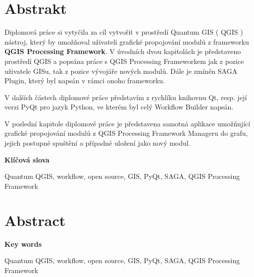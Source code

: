 \section*{Abstrakt}\label{abstract}
\indent Diplomová práce si vytyčila za cíl vytvořit v prostředí Quantum GIS ( QGIS ) nástroj, který by umožňoval uživateli grafické propojování modulů z frameworku \textbf{QGIS Processing Framework}. V úvodních dvou kapitolách je představeno prostředí QGIS a popsána práce s QGIS Processing Frameworkem jak z pozice uživatele GISu, tak z pozice vývojáře nových modulů. Dále je zmíněn SAGA Plugin, který byl napsán v rámci onoho frameworku.

V dalších částech diplomové práce představím z rychlíku knihovnu Qt, resp. její verzi PyQt pro jazyk Python, ve kterém byl celý Workflow Builder napsán.

V poslední kapitole diplomové práce je představena samotná aplikace umožňující grafické propojování modulů z QGIS Processing Framework Manageru do grafu, jejich postupné spuštění a případné uložení jako nový modul.

\textbf{Klíčová slova}

Quantum QGIS, workflow, open source, GIS, PyQt, SAGA, QGIS Processing Framework


\vfill

\section*{Abstract}
\indent

\textbf{Key words}

Quantum QGIS, workflow, open source, GIS, PyQt, SAGA, QGIS Processing Framework